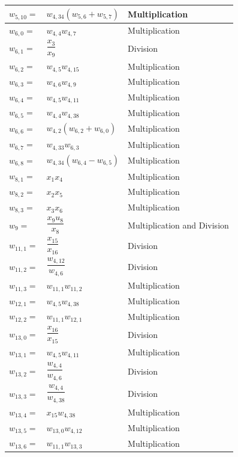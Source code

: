\begin{longtable}{|p{1.5cm}|l|p{2cm}|}
$w_{5,10}=$ & $ w_{4,34}\left(w_{5,6}+w_{5,7}\right) $ & Multiplication \\ \hline
$w_{6,0}=$ & $ w_{4,4}w_{4,7} $ & Multiplication \\ \hline
$w_{6,1}=$ & $ \dfrac{x_{3}}{x_{9}} $ & Division \\ \hline
$w_{6,2}=$ & $ w_{4,5}w_{4,15} $ & Multiplication \\ \hline
$w_{6,3}=$ & $ w_{4,6}w_{4,9} $ & Multiplication \\ \hline
$w_{6,4}=$ & $ w_{4,5}w_{4,11} $ & Multiplication \\ \hline
$w_{6,5}=$ & $ w_{4,4}w_{4,38} $ & Multiplication \\ \hline
$w_{6,6}=$ & $ w_{4,2}\left(w_{6,2}+w_{6,0}\right) $ & Multiplication \\ \hline
$w_{6,7}=$ & $ w_{4,33}w_{6,3} $ & Multiplication \\ \hline
$w_{6,8}=$ & $ w_{4,34}\left(w_{6,4}-w_{6,5}\right) $ & Multiplication \\ \hline
$w_{8,1}=$ & $ x_{1}x_{4} $ & Multiplication \\ \hline
$w_{8,2}=$ & $ x_{2}x_{5} $ & Multiplication \\ \hline
$w_{8,3}=$ & $ x_{3}x_{6} $ & Multiplication \\ \hline
$w_{9}=$ & $ \dfrac{x_{9}u_{8}}{x_{8}} $ & Multiplication and Division \\ \hline
$w_{11,1}=$ & $ \dfrac{x_{15}}{x_{16}} $ & Division\\ \hline
$w_{11,2}=$ & $ \dfrac{w_{4,12}}{w_{4,6}} $ & Division \\ \hline
$w_{11,3}=$ & $ w_{11,1}w_{11,2} $ & Multiplication \\ \hline
$w_{12,1}=$ & $ w_{4,5}w_{4,38} $ & Multiplication \\ \hline
$w_{12,2}=$ & $ w_{11,1}w_{12,1} $ & Multiplication \\ \hline
$w_{13,0}=$ & $ \dfrac{x_{16}}{x_{15}} $ & Division \\ \hline
$w_{13,1}=$ & $ w_{4,5}w_{4,11} $ & Multiplication \\ \hline
$w_{13,2}=$ & $ \dfrac{w_{4,4}}{w_{4,6}} $ & Division \\ \hline
$w_{13,3}=$ & $ \dfrac{w_{4,4}}{w_{4,38}} $ & Division \\ \hline
$w_{13,4}=$ & $ x_{15}w_{4,38} $ & Multiplication \\ \hline
$w_{13,5}=$ & $ w_{13,0}w_{4,12} $ & Multiplication \\ \hline
$w_{13,6}=$ & $ w_{11,1}w_{13,3} $ & Multiplication \\ \hline

\end{longtable}

